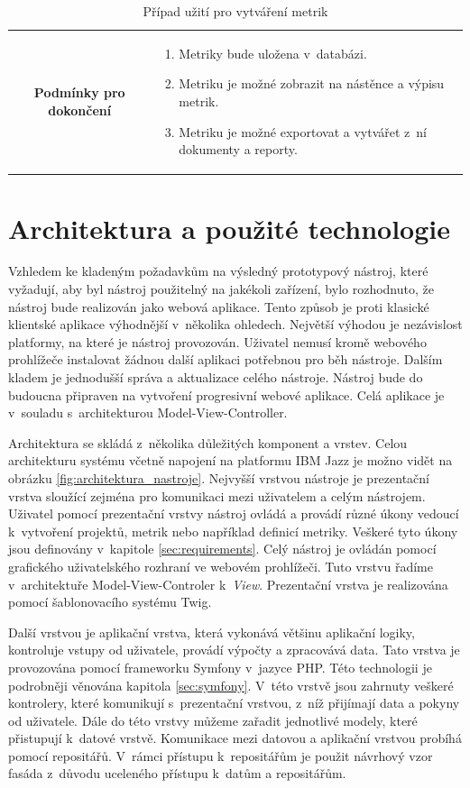 \documentclass[czech,master]{diploma}
\begin{document}
\begin{table}[htp]
\begin{center}
\begin{tabular}{c | m{10cm}}
\textbf{Podmínky pro dokončení} & 
\begin{enumerate}
\item Metriky bude uložena v~databázi.
\item Metriku je možné zobrazit na nástěnce a výpisu metrik.
\item Metriku je možné exportovat a vytvářet z~ní dokumenty a reporty.
\end{enumerate}                                                                                          
\end{tabular}
\caption{Případ užití pro vytváření metrik}
\label{tab:use_case_create_metric}
\end{center}
\end{table}


\section{Architektura a použité technologie}
Vzhledem ke kladeným požadavkům na výsledný prototypový nástroj, které vyžadují, aby byl nástroj použitelný na jakékoli zařízení, bylo rozhodnuto, že nástroj bude realizován jako webová aplikace. Tento způsob je proti klasické klientské aplikace výhodnější v~několika ohledech. Největší výhodou je nezávislost platformy, na které je nástroj provozován. Uživatel nemusí kromě webového prohlížeče instalovat žádnou další aplikaci potřebnou pro běh nástroje. Dalším kladem je jednodušší správa a aktualizace celého nástroje. Nástroj bude do budoucna připraven na vytvoření progresivní webové aplikace. Celá aplikace je v~souladu s~architekturou Model-View-Controller.

Architektura se skládá z~několika důležitých komponent a vrstev. Celou architekturu systému včetně napojení na platformu IBM Jazz je možno vidět na obrázku \ref{fig:architektura_nastroje}. Nejvyšší vrstvou nástroje je prezentační vrstva sloužící zejména pro komunikaci mezi uživatelem a celým nástrojem. Uživatel pomocí prezentační vrstvy nástroj ovládá a provádí různé úkony vedoucí k~vytvoření projektů, metrik nebo například definicí metriky. Veškeré tyto úkony jsou definovány v~kapitole \ref{sec:requirements}. Celý nástroj je ovládán pomocí grafického uživatelského rozhraní ve webovém prohlížeči. Tuto vrstvu řadíme v~architektuře Model-View-Controler k~\textit{View}. Prezentační vrstva je realizována pomocí šablonovacího systému Twig.

Další vrstvou je aplikační vrstva, která vykonává většinu aplikační logiky, kontroluje vstupy od uživatele, provádí výpočty a zpracovává data. Tato vrstva je provozována pomocí frameworku Symfony v~jazyce PHP. Této technologii je podrobněji věnována kapitola \ref{sec:symfony}. V~této vrstvě jsou zahrnuty veškeré kontrolery, které komunikují s~prezentační vrstvou, z~níž přijímají data a pokyny od uživatele. Dále do této vrstvy můžeme zařadit jednotlivé modely, které přistupují k~datové vrstvě. Komunikace mezi datovou a aplikační vrstvou probíhá pomocí repositářů. V~rámci přístupu k~repositářům je použit návrhový vzor fasáda z~důvodu uceleného přístupu k~datům a repositářům.
\end{document}
